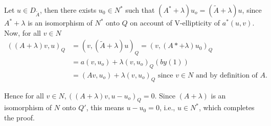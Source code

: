 Let $u \in D_{\tilde{A}}$, then there exists $u_0 \in
N^*$ such that $(A^* + \lambda)u_o = (\tilde{A} + \lambda)u$, since
$A^* + \lambda$ is an isomorphism of $N^*$ onto $Q$ on account of
V-ellipticity of $a^*(u, v)$. Now, for all $v \in N$ 
\begin{align*}
((A + \lambda)v, u)_Q & = (v, (\tilde{A} + \lambda)u)_Q = (v, (A* +
  \lambda)u_0)_Q\\ 
& = a(v, u_o) + \lambda(v, u_o)_Q (by (1))\\
& = (Av, u_o) + \lambda(v, u_o)_Q \text{ since $v \in N$ and
    by definition of $A$.} 
\end{align*}

Hence for all $v \in N, ((A + \lambda)v, u-u_o)_Q = 0$. Since
$(A + \lambda)$ is an isomorphism of $N$ onto $Q'$, this means $u-u_0
= 0$, i.e., $u \in N^*$, which completes the proof. 
